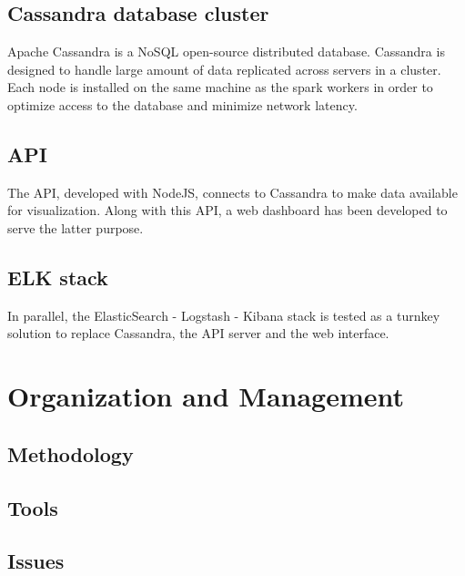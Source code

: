 \documentclass[11pt]{article}
\begin{document}
\subsection{Cassandra database cluster}

Apache Cassandra is a NoSQL open-source distributed database. Cassandra is designed to handle large amount of data replicated across servers in a cluster. Each node is installed on the same machine as the spark workers in order to optimize access to the database and minimize network latency.

\subsection{API}

The API, developed with NodeJS, connects to Cassandra to make data available for visualization. Along with this API, a web dashboard has been developed to serve the latter purpose.

\subsection{ELK stack}

In parallel, the ElasticSearch - Logstash - Kibana stack is tested as a turnkey solution to replace Cassandra, the API server and the web interface. %

\section{Organization and Management}

\subsection{Methodology}


\subsection{Tools}


\subsection{Issues}
\end{document}
